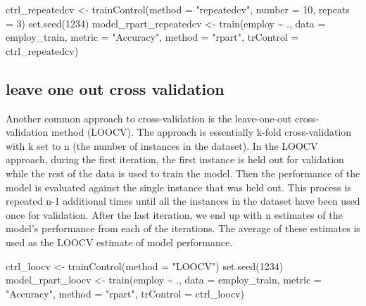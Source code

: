 \documentclass[
]{book}
\newenvironment{Shaded}{\begin{snugshade}}{\end{snugshade}}
\newcommand{\AttributeTok}[1]{\textcolor[rgb]{0.77,0.63,0.00}{#1}}
\newcommand{\DecValTok}[1]{\textcolor[rgb]{0.00,0.00,0.81}{#1}}
\newcommand{\FunctionTok}[1]{\textcolor[rgb]{0.00,0.00,0.00}{#1}}
\newcommand{\NormalTok}[1]{#1}
\newcommand{\OtherTok}[1]{\textcolor[rgb]{0.56,0.35,0.01}{#1}}
\newcommand{\SpecialCharTok}[1]{\textcolor[rgb]{0.00,0.00,0.00}{#1}}
\newcommand{\StringTok}[1]{\textcolor[rgb]{0.31,0.60,0.02}{#1}}
\begin{document}
\begin{Shaded}
\begin{Highlighting}[]
\NormalTok{ctrl\_repeatedcv }\OtherTok{\textless{}{-}} \FunctionTok{trainControl}\NormalTok{(}\AttributeTok{method =} \StringTok{"repeatedcv"}\NormalTok{, }
                                \AttributeTok{number =} \DecValTok{10}\NormalTok{, }\AttributeTok{repeats =} \DecValTok{3}\NormalTok{)}
\FunctionTok{set.seed}\NormalTok{(}\DecValTok{1234}\NormalTok{)}
\NormalTok{model\_rpart\_repeatedcv }\OtherTok{\textless{}{-}} \FunctionTok{train}\NormalTok{(employ }\SpecialCharTok{\textasciitilde{}}\NormalTok{ .,}
                        \AttributeTok{data =}\NormalTok{ employ\_train,}
                        \AttributeTok{metric =} \StringTok{"Accuracy"}\NormalTok{,}
                        \AttributeTok{method =} \StringTok{"rpart"}\NormalTok{,}
                        \AttributeTok{trControl =}\NormalTok{ ctrl\_repeatedcv)}
\end{Highlighting}
\end{Shaded}

\hypertarget{leave-one-out-cross-validation}{%
\subsection{leave one out cross validation}\label{leave-one-out-cross-validation}}

Another common approach to cross-validation is the leave-one-out cross-validation
method (LOOCV). The approach is essentially k-fold cross-validation with k set to n (the number of instances in the dataset). In the LOOCV approach, during the first iteration, the first instance is held out for validation while the rest of the data is used to train the model.
Then the performance of the model is evaluated against the single instance that was
held out. This process is repeated n-1 additional times until all the instances in the dataset have been used once for validation. After the last iteration, we end up with n estimates of the model's performance from each of the iterations. The average of these estimates is used as the LOOCV estimate of model performance.

\begin{Shaded}
\begin{Highlighting}[]
\NormalTok{ctrl\_loocv }\OtherTok{\textless{}{-}} \FunctionTok{trainControl}\NormalTok{(}\AttributeTok{method =} \StringTok{"LOOCV"}\NormalTok{)}
\FunctionTok{set.seed}\NormalTok{(}\DecValTok{1234}\NormalTok{)}
\NormalTok{model\_rpart\_loocv }\OtherTok{\textless{}{-}} \FunctionTok{train}\NormalTok{(employ }\SpecialCharTok{\textasciitilde{}}\NormalTok{ .,}
                           \AttributeTok{data =}\NormalTok{ employ\_train,}
                           \AttributeTok{metric =} \StringTok{"Accuracy"}\NormalTok{,}
                           \AttributeTok{method =} \StringTok{"rpart"}\NormalTok{,}
                           \AttributeTok{trControl =}\NormalTok{ ctrl\_loocv)}
\end{Highlighting}
\end{Shaded}
\end{document}
